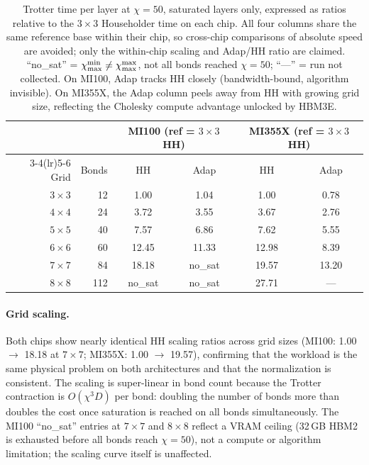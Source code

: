 \begin{table}[ht]
\centering
\caption{Trotter time per layer at $\chi=50$, saturated layers only, expressed as
  ratios relative to the $3\times3$ Householder time on each chip.
  All four columns share the same reference base within their chip, so
  cross-chip comparisons of absolute speed are avoided; only the
  within-chip scaling and Adap/HH ratio are claimed.
  ``no\_sat'' = $\chi_{\mathrm{max}}^{\min} \neq \chi_{\mathrm{max}}^{\max}$, not all bonds reached $\chi=50$;
  ``---'' = run not collected.
  On MI100, Adap tracks HH closely (bandwidth-bound, algorithm invisible).
  On MI355X, the Adap column peels away from HH with growing grid size,
  reflecting the Cholesky compute advantage unlocked by HBM3E.}
\label{tab:grid_scaling_mi355x}
\smallskip
\small
\begin{tabular}{r r cc cc}
\toprule
& & \multicolumn{2}{c}{MI100 (ref = $3\times3$ HH)} & \multicolumn{2}{c}{MI355X (ref = $3\times3$ HH)} \\
\cmidrule(lr){3-4}\cmidrule(lr){5-6}
Grid & Bonds & HH & Adap & HH & Adap \\
\midrule
$3\times3$ & 12  & 1.00  & 1.04    & 1.00  & 0.78  \\
$4\times4$ & 24  & 3.72  & 3.55    & 3.67  & 2.76  \\
$5\times5$ & 40  & 7.57  & 6.86    & 7.62  & 5.55  \\
$6\times6$ & 60  & 12.45 & 11.33   & 12.98 & 8.39  \\
$7\times7$ & 84  & 18.18 & no\_sat & 19.57 & 13.20 \\
$8\times8$ & 112 & no\_sat & no\_sat & 27.71 & ---  \\
\bottomrule
\end{tabular}
\end{table}

\paragraph{Grid scaling.}
Both chips show nearly identical HH scaling ratios across grid sizes
(MI100: 1.00 $\to$ 18.18 at $7\times7$; MI355X: 1.00 $\to$ 19.57),
confirming that the workload is the same physical problem on both architectures
and that the normalization is consistent.
The scaling is super-linear in bond count because the Trotter contraction is
$O(\chi^3 D)$ per bond: doubling the number of bonds more than doubles the
cost once saturation is reached on all bonds simultaneously.
The MI100 ``no\_sat'' entries at $7\times7$ and $8\times8$ reflect a VRAM
ceiling (32\,GB HBM2 is exhausted before all bonds reach $\chi=50$), not
a compute or algorithm limitation; the scaling curve itself is unaffected.

